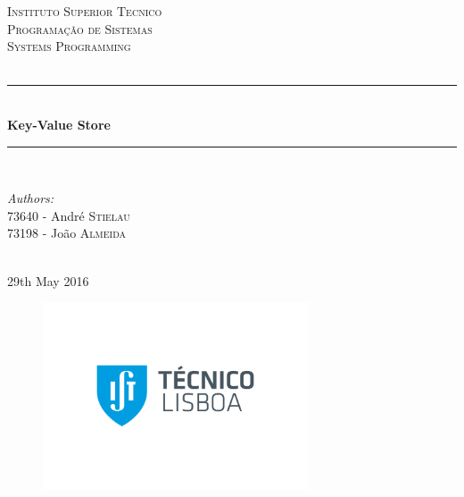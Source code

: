 \documentclass[12pt]{article} %
\begin{document}

\begin{titlepage}

\newcommand{\HRule}{\rule{\linewidth}{0.5mm}} %

\center %

\textsc{\LARGE Instituto Superior Tecnico}\\[1cm] %
\textsc{\Large Programação de Sistemas \\ Systems Programming}\\[0.5cm] %
\textsc{\large}\\[0.5cm] %
\HRule \\[0.4cm]
{ \LARGE \bfseries Key-Value Store}\\[0.4cm]
\HRule \\[1cm]

\begin{minipage}{0.6\textwidth}
\begin{flushleft} \large
\emph{Authors:}\\
73640 - André \textsc{Stielau}\\
73198 - João \textsc{Almeida}\\

\end{flushleft}
\end{minipage}
~
\\[1cm]
{\large 29th May 2016}\\[1cm] %

\begin{figure}[H]
\centering
\includegraphics[width=0.7\textwidth]{./Pictures/tecnico.png}
\end{figure}

\vfill %

\end{titlepage}
\end{document}
